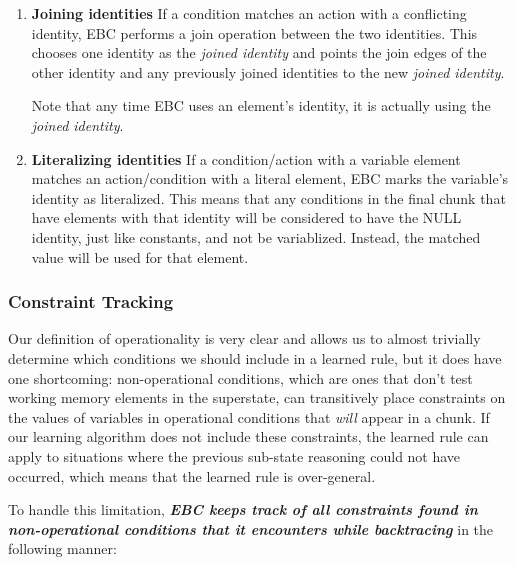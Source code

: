 \begin{enumerate}
	\item \textbf{Joining identities} \newline
	If a condition matches an action with a conflicting identity, EBC performs a join operation between the two identities. This chooses one identity as the \textit{joined identity} and points the join edges of the other identity and any previously joined identities to the new \textit{joined identity}.

	Note that any time EBC uses an element's identity, it is actually using the \textit{joined identity}.
	
	\item \textbf{Literalizing identities} \newline
	If a condition/action with a variable element matches an action/condition with a literal element, EBC marks the variable's identity as literalized.  This means that any conditions in the final chunk that have elements with that identity will be considered to have the NULL identity, just like constants, and not be variablized.  Instead, the matched value will be used for that element.
\end{enumerate}


\subsubsection{Constraint Tracking}

Our definition of operationality is very clear and allows us to almost trivially determine which conditions we should include in a learned rule, but it does have one shortcoming: non-operational conditions, which are ones that don't test working memory elements in the superstate, can transitively place constraints on the values of variables in operational conditions that \textit{will} appear in a chunk.  If our learning algorithm does not include these constraints, the learned rule can apply to situations where the previous sub-state reasoning could not have occurred, which means that the learned rule is over-general.

To handle this limitation, \textbf{\textit{EBC keeps track of all constraints found in non-operational conditions that it encounters while backtracing}} in the following manner:

